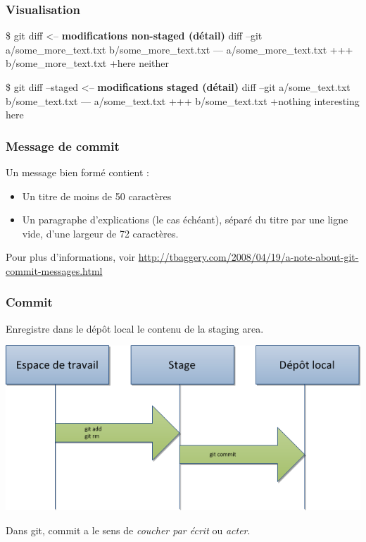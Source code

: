 \begin{frame}[fragile]\frametitle{Visualisation}
  
\begin{semiverbatim}

  \$ \alert{git diff}  <-- \textbf{modifications non-staged (détail)}
  diff --git a/some_more_text.txt b/some_more_text.txt
  --- a/some_more_text.txt
  +++ b/some_more_text.txt
  +here neither
	
  \$ \alert{git diff --staged}  <-- \textbf{modifications staged (détail)}
  diff --git a/some_text.txt b/some_text.txt
  --- a/some_text.txt
  +++ b/some_text.txt
  +nothing interesting here
\end{semiverbatim}

\end{frame}
\begin{frame}[fragile]\frametitle{Message de commit}
\begin{block}{Un message bien formé contient :}
  \begin{itemize}
    \item Un titre de moins de 50 caractères
    \item Un paragraphe d'explications (le cas échéant), séparé du titre par une ligne vide, d'une largeur de 72 caractères.
  \end{itemize}
\end{block}

Pour plus d'informations, voir
\url{http://tbaggery.com/2008/04/19/a-note-about-git-commit-messages.html}
\end{frame}
\begin{frame}\frametitle{Commit}
  Enregistre dans le dépôt local le contenu de la staging area.
  \begin{center}
    \includegraphics[width=\textwidth]{./images/staging-area.png}
  \end{center}
  Dans git, \alert{commit} a le sens de \textit{coucher par écrit} ou
\textit{acter}.
\end{frame}

